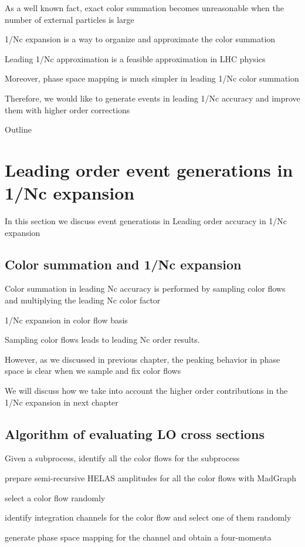 \documentclass{book}
\begin{document}
As a well known fact, exact color summation becomes unreasonable when the number of external particles is large

1/Nc expansion is a way to organize and approximate the color summation

Leading 1/Nc approximation is a feasible approximation in LHC physics

Moreover, phase space mapping is much simpler in leading 1/Nc color summation

Therefore, we would like to generate events in leading 1/Nc accuracy and improve them with higher order corrections

Outline

\section{Leading order event generations in 1/Nc expansion}
In this section we discuss event generations in Leading order accuracy in 1/Nc expansion

\subsection{Color summation and 1/Nc expansion}
Color summation in leading Nc accuracy is performed by sampling color flows and multiplying the leading Nc color factor

1/Nc expansion in color flow basis

Sampling color flows leads to leading Nc order results.

However, as we discussed in previous chapter, the peaking behavior in phase space is clear when we sample and fix color flows

We will discuss how we take into account the higher order contributions in the 1/Nc expansion in next chapter

\subsection{Algorithm of evaluating LO cross sections}
Given a subprocess, identify all the color flows for the subprocess

prepare semi-recursive HELAS amplitudes for all the color flows with MadGraph

select a color flow randomly

identify integration channels for the color flow and select one of them randomly

generate phase space mapping for the channel and obtain a four-momenta
\end{document}
